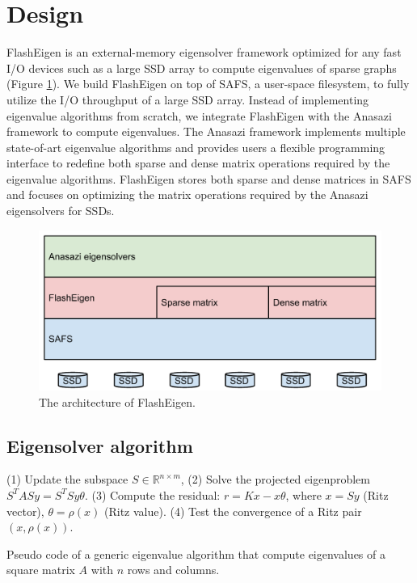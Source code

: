 \section{Design}
FlashEigen is an external-memory eigensolver framework optimized for any fast
I/O devices
such as a large SSD array to compute eigenvalues of sparse graphs (Figure
\ref{arch}). We build FlashEigen on top of SAFS, a user-space filesystem,
to fully utilize the I/O throughput of a large SSD array. Instead of
implementing eigenvalue algorithms from scratch, we integrate FlashEigen
with the Anasazi framework to compute eigenvalues. The Anasazi framework
implements multiple state-of-art eigenvalue algorithms and provides users
a flexible programming interface to redefine both sparse and dense matrix
operations required by the eigenvalue algorithms. FlashEigen stores both sparse
and dense matrices in SAFS and focuses on optimizing the matrix operations
required by the Anasazi eigensolvers for SSDs.

\begin{figure}
\centering
\includegraphics[scale=0.4]{./architecture.pdf}
\caption{The architecture of FlashEigen.}
\label{arch}
\end{figure}

\subsection{Eigensolver algorithm}


\begin{algorithm}
	\begin{algorithmic}[1]
		\State (1) Update the subspace $S \in \mathbb{R}^{n \times m}$,
		\State (2) Solve the projected eigenproblem $S^TASy = S^TSy\theta$.
		\State (3) Compute the residual: $r = Kx - x\theta$, where
		\State\hspace{\algorithmicindent} $x = Sy$ (Ritz vector), $\theta = \rho(x)$ (Ritz value).
		\State (4) Test the convergence of a Ritz pair $(x, \rho(x))$.
		\EndFor
	\end{algorithmic}
	\caption{Pseudo code of a generic eigenvalue algorithm that compute eigenvalues
	of a square matrix $A$ with $n$ rows and columns.}
	\label{eigencode}
\end{algorithm}

